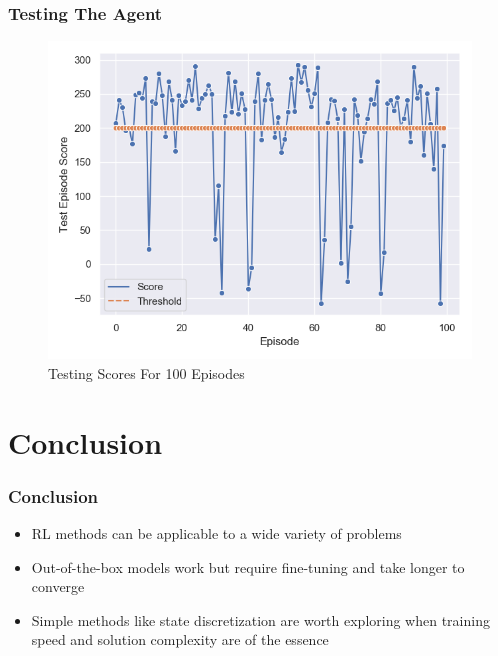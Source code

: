 \documentclass{beamer}
\begin{document}
\begin{frame}
\frametitle{Testing The Agent}


\begin{figure}[H]
	\includegraphics[scale=0.35]{test}
	\centering
	\caption{Testing Scores For 100 Episodes}
	\label{f:test}
\end{figure}
\end{frame}








\section{Conclusion}

\begin{frame}
\frametitle{Conclusion}
\begin{itemize}
	\item RL methods can be applicable to
	a wide variety of problems
	
	\item Out-of-the-box models work but 
	require fine-tuning and take 
	longer to converge
	
	\item Simple methods like state discretization
	are worth exploring when training speed and
	solution complexity are of the essence 
	
\end{itemize}
\end{frame}
\end{document}

